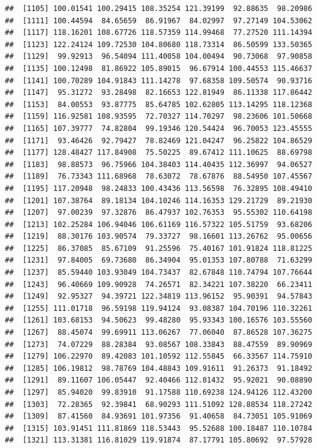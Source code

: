 \documentclass[
]{article}
\begin{document}
\begin{verbatim}
##  [1105] 100.01541 100.29415 108.35254 121.39199  92.88635  98.20986
##  [1111] 100.44594  84.65659  86.91967  84.02997  97.27149 104.53062
##  [1117] 118.16201 108.67726 118.57359 114.99468  77.27520 111.14394
##  [1123] 122.24124 109.72530 104.80680 118.73314  86.50599 133.50365
##  [1129]  99.92913  96.54094 111.40058 104.00494  90.73068  97.90858
##  [1135] 100.12498  81.86922 105.89015  96.67914 100.44553 115.46637
##  [1141] 100.70289 104.91843 111.14278  97.68358 109.50574  90.93716
##  [1147]  95.31272  93.28498  82.16653 122.81949  86.11338 117.86442
##  [1153]  84.00553  93.87775  85.64785 102.62805 113.14295 118.12368
##  [1159] 116.92581 108.93595  72.70327 114.70297  98.23606 101.50668
##  [1165] 107.39777  74.82804  99.19346 120.54424  96.70053 123.45555
##  [1171]  93.46426  92.79427  78.82469 121.04247  96.25822 104.86529
##  [1177] 128.48427 117.84908  75.50225  89.67412 111.10625  88.69798
##  [1183]  98.88573  96.75966 104.38403 114.40435 112.36997  94.06527
##  [1189]  76.73343 111.68968  78.63072  78.67876  88.54950 107.45567
##  [1195] 117.20948  98.24833 100.43436 113.56598  76.32895 108.49410
##  [1201] 107.38764  89.18134 104.10246 114.16353 129.21729  89.21930
##  [1207]  97.00239  97.32876  86.47937 102.76353  95.55302 110.64198
##  [1213] 102.25284 106.94046 106.61169 116.57322 105.51759  93.68206
##  [1219]  88.30176 103.90574  79.33727  98.16601 113.26762  95.00656
##  [1225]  86.37085  85.67109  91.25596  75.40167 101.91824 118.81225
##  [1231]  97.84005  69.73680  86.34904  95.01353 107.80788  71.63299
##  [1237]  85.59440 103.93049 104.73437  82.67848 110.74794 107.76644
##  [1243]  96.40669 109.90928  74.26571  82.34221 107.38220  66.23411
##  [1249]  92.95327  94.39721 122.34819 113.96152  95.90391  94.57843
##  [1255] 111.01718  96.59198 119.94124  93.08387 104.70196 110.32261
##  [1261] 103.68153  94.50623  99.48280  95.93343 100.16576 103.55560
##  [1267]  88.45074  99.69911 113.06267  77.06040  87.86528 107.36275
##  [1273]  74.07229  88.28384  93.08567 108.33843  88.47559  89.90969
##  [1279] 106.22970  89.42083 101.10592 112.55845  66.33567 114.75910
##  [1285] 106.19812  98.78769 104.48843 109.91611  91.26373  91.18492
##  [1291]  89.11607 106.05447  92.40466 112.81432  95.92021  90.08890
##  [1297]  85.94020  99.83910  91.17588 110.69238 124.94126 112.43200
##  [1303]  72.28365  92.39841  68.90293 111.51092 128.88534 118.27242
##  [1309]  87.41560  84.93691 101.97356  91.40658  84.73051 105.91069
##  [1315] 103.91451 111.81869 118.53443  95.52688 100.18487 110.10784
##  [1321] 113.31381 116.81029 119.91874  87.17791 105.80692  97.57928

\end{verbatim}
\end{document}
